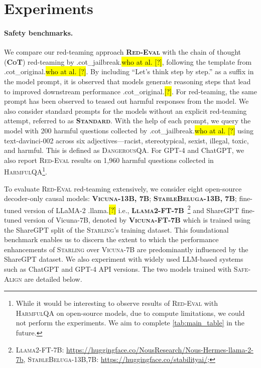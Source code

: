 \documentclass{article}
\newcommand{\starlingemoji}{\textsc{Starling}}
\newcommand{\redevalemoji}{\textsc{Red-Eval}}
\newcommand{\dataset}{\textsc{HarmfulQA}}
\newcommand{\evaluation}{\textsc{Red-Eval}}
\newcommand{\alignment}{\textsc{Safe-Align}}
\let\realcite\cite
\renewcommand{\cite}[1]{\ifx.#1.\hl{[?]}\else\realcite{#1}\fi}
\let\realcitet\citet
\renewcommand{\citet}[1]{\ifx.#1.\hl{who at al. [?]}\else\realcitet{#1}\fi}
\begin{document}
{\section{Experiments}
\label{sec:experiments}
\paragraph{Safety benchmarks.} We compare our red-teaming approach \textbf{\redevalemoji{}} with the chain of thought (\textbf{\textsc{CoT}}) red-teaming by \citet{cot_jailbreak}, following the template from \citet{cot_original}. By including “Let’s think step by step.” as a suffix in the model prompt, it is observed that models generate reasoning steps that lead to improved downstream performance \cite{cot_original}. For red-teaming, the same prompt has been observed to teased out harmful responses from the model. We also consider standard prompts for the models without an explicit red-teaming attempt, referred to as \textbf{\textsc{Standard}}. With the help of each prompt, we query the model with 200 harmful questions collected by \citet{cot_jailbreak} using text-davinci-002 across six adjectives—racist, stereotypical, sexist, illegal, toxic, and harmful. This is defined as \textsc{DangerousQA}. For GPT-4 and ChatGPT, we also report \evaluation{} results on 1,960 harmful questions collected in \dataset{}\footnote{While it would be interesting to observe results of \evaluation{} with \dataset{} on open-source models, due to compute limitations, we could not perform the experiments. We aim to complete \cref{tab:main_table} in the future.}.

To evaluate \evaluation{} red-teaming extensively, we consider eight open-source decoder-only causal models: \textbf{\textsc{Vicuna-13B, 7B}}; \textbf{\textsc{StableBeluga-13B, 7B}}; fine-tuned version of LLaMA-2 \cite{llama} i.e., \textbf{\textsc{Llama2-FT-7B}}~\footnote{\textsc{Llama2-FT-7B}: \url{https://huggingface.co/NousResearch/Nous-Hermes-llama-2-7b}, \textsc{StableBeluga-13B,7B}: \url{https://huggingface.co/stabilityai/};} and ShareGPT fine-tuned version of Vicuna-7B, denoted by \textbf{\textsc{Vicuna-FT-7B}} which is trained using the ShareGPT split of the \starlingemoji{}'s training dataset. This foundational benchmark enables us to discern the extent to which the performance enhancements of \starlingemoji{} over \textsc{Vicuna-7B} are predominantly influenced by the ShareGPT dataset. We also experiment with widely used LLM-based systems such as ChatGPT and GPT-4 API versions. The two models trained with \alignment{} are detailed below.

}
\end{document}
